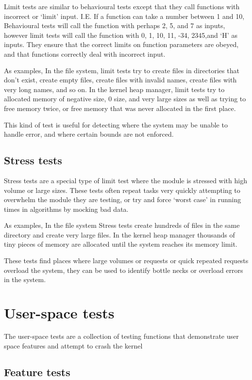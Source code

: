 \documentclass[a4paper]{report}
\begin{document}
Limit tests are similar to behavioural tests except that they call functions with incorrect or `limit' input. I.E. If a function can take a number between 1 and 10, Behavioural tests will call the function with perhaps 2, 5, and 7 as inputs, however limit tests will call the function with 0, 1, 10, 11, -34, 2345,and `H' as inputs. They ensure that the correct limits on function parameters are obeyed, and that functions correctly deal with incorrect input.

As examples, In the file system, limit tests try to create files in directories that don't exist, create empty files, create files with invalid names, create files with very long names, and so on. In the kernel heap manager, limit tests try to allocated memory of negative size, 0 size, and very large sizes as well as trying to free memory twice, or free memory that was never allocated in the first place.

This kind of test is useful for detecting where the system may be unable to handle error, and where certain bounds are not enforced.

\subsection{Stress tests}

Stress tests are a special type of limit test where the module is stressed with high volume or large sizes. These tests often repeat tasks very quickly attempting to overwhelm the module they are testing, or try and force `worst case' in running times in algorithms by mocking bad data.

As examples, In the file system Stress tests create hundreds of files in the same directory and create very large files. In the kernel heap manager thousands of tiny pieces of memory are allocated until the system reaches its memory limit.

These tests find places where large volumes or requests or quick repeated requests overload the system, they can be used to identify bottle necks or overload errors in the system.


\section{User-space tests}

The user-space tests are a collection of testing functions that demonstrate user space features and attempt to crash the kernel

\subsection{Feature tests}
\end{document}
